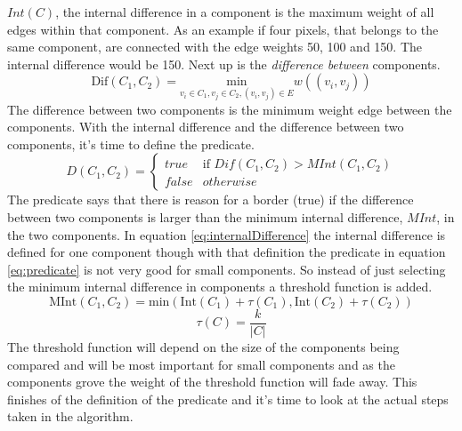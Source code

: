 \(Int(C)\), the internal difference in a component is the maximum weight of
all edges within that component. As an example if four pixels, that belongs to the same component,
are connected with the edge weights 50, 100 and 150. The internal difference
would be 150. Next up is the {\em difference between} components.
\begin{equation}
    \label{eq:differenceBetween}
    \text{Dif}(C_1,C_2) = \underset{v_i \in C_1,v_j \in C_2, (v_i,v_j) \in E}{\text{min}} w((v_i,v_j))
\end{equation}
The difference between two components is the minimum weight edge between the
components. With the internal difference and the difference between two components,
it's time to define the predicate.
\begin{equation}
    \label{eq:predicate}
    D(C_1,C_2) =
    \begin{cases}
        true & \text{if } Dif(C_1,C_2) > MInt(C_1,C_2) \\
        false & otherwise
    \end{cases}
\end{equation}
The predicate says that there is reason for a border (true) if the difference
between two components is larger than the minimum internal difference, \(MInt\),
in the two components. In equation \ref{eq:internalDifference} the internal
difference is defined for one component though with that definition the predicate
in equation \ref{eq:predicate} is not very good for small components. So instead
of just selecting the minimum internal difference in components a threshold function
is added.
\begin{equation}
    \label{eq:minimumInternal}
    \text{MInt}(C_1,C_2) = \text{min}(\text{Int}(C_1) + \tau(C_1),\text{Int}(C_2) + \tau(C_2))
\end{equation}
\begin{equation}
    \label{eq:threshold}
    \tau(C) = \frac{k}{|C|}
\end{equation}
The threshold function will depend on the size of the components being compared
and will be most important for small components and as the components grove the
weight of the threshold function will fade away. This finishes of the definition
of the predicate and it's time to look at the actual steps taken in the
algorithm.

